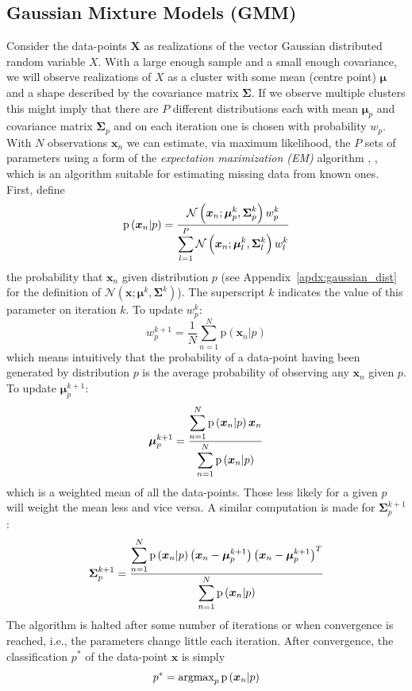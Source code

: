 \subsection{Gaussian Mixture Models (GMM) \label{sec:gmm}}

Consider the data-points $\boldsymbol{X}$ as realizations of the vector Gaussian
distributed random variable $X$. With a large enough sample and a small enough
covariance, we will observe realizations of $X$ as a cluster with some mean
(centre point) $\boldsymbol{\mu}$ and a shape described by the covariance matrix
$\boldsymbol{\Sigma}$. If we observe multiple clusters this might imply that
there are $P$ different distributions each with mean $\boldsymbol{\mu}_p$ and
covariance matrix $\boldsymbol{\Sigma}_p$ and on each iteration one is chosen
with probability $w_p$. With $N$ observations $\boldsymbol{x}_{n}$ we can
estimate, via maximum likelihood, the $P$ sets of parameters using a form of the
\textit{expectation maximization (EM)} algorithm \cite{moon1996expectation},
\cite{dempster1977maximum}, which is an algorithm suitable for estimating
missing data from known ones. First, define
\[
    \mathrm{p} \left( \boldsymbol{x}_{n} | p \right)
    =
    \frac{\displaystyle 
        \mathcal{N} \left( \boldsymbol{x}_{n}; \boldsymbol{\mu}^{k}_{p} ,
        \boldsymbol{\Sigma}^{k}_{p} \right) w^{k}_{p}
    }{\displaystyle 
        \sum_{l=1}^{P}
        \mathcal{N} \left( \boldsymbol{x}_{n}; \boldsymbol{\mu}^{k}_{l} ,
        \boldsymbol{\Sigma}^{k}_{l} \right) w^{k}_{l}
    }
\]
the probability that $\boldsymbol{x}_n$ given distribution $p$ (see
Appendix~\ref{apdx:gaussian_dist} for the definition of $\mathcal{N} \left(
\boldsymbol{x} ; \boldsymbol{\mu}^{k} , \boldsymbol{\Sigma}^{k} \right)$). The superscript $k$
indicates the value of this parameter on iteration $k$. To update $w^{k}_p$:
\[
    w^{k+1}_p = \frac{1}{N} \sum_{n=1}^{N} \mathrm{p} \left( \boldsymbol{x}_n |
    p \right)
\]
which means intuitively that the probability of a data-point having been
generated by distribution $p$ is the average probability of observing any
$\boldsymbol{x}_n$ given $p$. To update $\boldsymbol{\mu}^{k+1}_p$:
\[
    \boldsymbol{\mu}^{k+1}_p
    =
    \frac{\displaystyle \sum_{n=1}^{N} \mathrm{p} \left( \boldsymbol{x}_n |
    p \right) \boldsymbol{x}_n }{\displaystyle \sum_{n=1}^{N} \mathrm{p} \left( \boldsymbol{x}_n |
    p \right)}
\]
which is a weighted mean of all the data-points. Those less likely for a
given $p$ will weight the mean less and vice versa. A similar computation is
made for $\boldsymbol{\Sigma}^{k+1}_p$:
\[
    \boldsymbol{\Sigma}^{k+1}_p
    =
    \frac{\displaystyle \sum_{n=1}^{N} \mathrm{p} \left( \boldsymbol{x}_n | p \right)
        \left( \boldsymbol{x}_n - \boldsymbol{\mu}^{k+1}_p \right) \left(
        \boldsymbol{x}_n - \boldsymbol{\mu}^{k+1}_p \right)^{T}
    }{\displaystyle 
        \sum_{n=1}^{N} \mathrm{p} \left( \boldsymbol{x}_n | p \right)
    }
\]
The algorithm is halted after some number of iterations or when convergence is
reached, i.e., the parameters change little each iteration. After convergence, the
classification $p^{\ast}$ of the data-point $\boldsymbol{x}$ is simply
\[
    p^{\ast} = \operatorname{argmax}_{p} \mathrm{p} \left( \boldsymbol{x}_n | p \right)
\]

